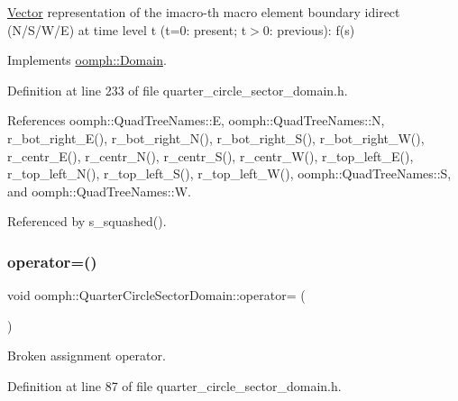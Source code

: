 \hyperlink{classoomph_1_1Vector}{Vector} representation of the imacro-\/th macro element boundary idirect (N/\+S/\+W/E) at time level t (t=0\+: present; t$>$0\+: previous)\+: f(s) 

Implements \hyperlink{classoomph_1_1Domain_a95f3e00d28ea37e6c4d3027bfac91096}{oomph\+::\+Domain}.



Definition at line 233 of file quarter\+\_\+circle\+\_\+sector\+\_\+domain.\+h.



References oomph\+::\+Quad\+Tree\+Names\+::E, oomph\+::\+Quad\+Tree\+Names\+::N, r\+\_\+bot\+\_\+right\+\_\+\+E(), r\+\_\+bot\+\_\+right\+\_\+\+N(), r\+\_\+bot\+\_\+right\+\_\+\+S(), r\+\_\+bot\+\_\+right\+\_\+\+W(), r\+\_\+centr\+\_\+\+E(), r\+\_\+centr\+\_\+\+N(), r\+\_\+centr\+\_\+\+S(), r\+\_\+centr\+\_\+\+W(), r\+\_\+top\+\_\+left\+\_\+\+E(), r\+\_\+top\+\_\+left\+\_\+\+N(), r\+\_\+top\+\_\+left\+\_\+\+S(), r\+\_\+top\+\_\+left\+\_\+\+W(), oomph\+::\+Quad\+Tree\+Names\+::S, and oomph\+::\+Quad\+Tree\+Names\+::W.



Referenced by s\+\_\+squashed().

\mbox{\label{classoomph_1_1QuarterCircleSectorDomain_a13bb4a1ac04f99ded56c398474676ce1}} 
\subsubsection{\texorpdfstring{operator=()}{operator=()}}
{\footnotesize\ttfamily void oomph\+::\+Quarter\+Circle\+Sector\+Domain\+::operator= (\begin{DoxyParamCaption}\item[{const \hyperlink{classoomph_1_1QuarterCircleSectorDomain}{Quarter\+Circle\+Sector\+Domain} \&}]{ }\end{DoxyParamCaption})\hspace{0.3cm}{\ttfamily [inline]}}



Broken assignment operator. 



Definition at line 87 of file quarter\+\_\+circle\+\_\+sector\+\_\+domain.\+h.




